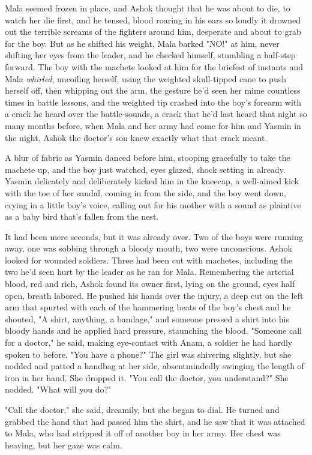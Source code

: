 Mala seemed frozen in place, and Ashok thought that he was about to
die, to watch her die first, and he tensed, blood roaring in his
ears so loudly it drowned out the terrible screams of the fighters
around him, desperate and about to grab for the boy. But as he
shifted his weight, Mala barked "NO!" at him, never shifting her
eyes from the leader, and he checked himself, stumbling a half-step
forward. The boy with the machete looked at him for the briefest of
instants and Mala \emph{whirled}, uncoiling herself, using the
weighted skull-tipped cane to push herself off, then whipping out
the arm, the gesture he'd seen her mime countless times in battle
lessons, and the weighted tip crashed into the boy's forearm with a
crack he heard over the battle-sounds, a crack that he'd last heard
that night so many months before, when Mala and her army had come
for him and Yasmin in the night. Ashok the doctor's son knew
exactly what that crack meant.

A blur of fabric as Yasmin danced before him, stooping gracefully
to take the machete up, and the boy just watched, eyes glazed,
shock setting in already. Yasmin delicately and deliberately kicked
him in the kneecap, a well-aimed kick with the toe of her sandal,
coming in from the side, and the boy went down, crying in a little
boy's voice, calling out for his mother with a sound as plaintive
as a baby bird that's fallen from the nest.

It had been mere seconds, but it was already over. Two of the boys
were running away, one was sobbing through a bloody mouth, two were
unconscious. Ashok looked for wounded soldiers. Three had been cut
with machetes, including the two he'd seen hurt by the leader as he
ran for Mala. Remembering the arterial blood, red and rich, Ashok
found its owner first, lying on the ground, eyes half open, breath
labored. He pushed his hands over the injury, a deep cut on the
left arm that spurted with each of the hammering beats of the boy's
chest and he shouted, "A shirt, anything, a bandage," and someone
pressed a shirt into his bloody hands and he applied hard pressure,
staunching the blood. "Someone call for a doctor," he said, making
eye-contact with Anam, a soldier he had hardly spoken to before.
"You have a phone?" The girl was shivering slightly, but she nodded
and patted a handbag at her side, absentmindedly swinging the
length of iron in her hand. She dropped it. "You call the doctor,
you understand?" She nodded. "What will you do?"

"Call the doctor," she said, dreamily, but she began to dial. He
turned and grabbed the hand that had passed him the shirt, and he
saw that it was attached to Mala, who had stripped it off of
another boy in her army. Her chest was heaving, but her gaze was
calm.

